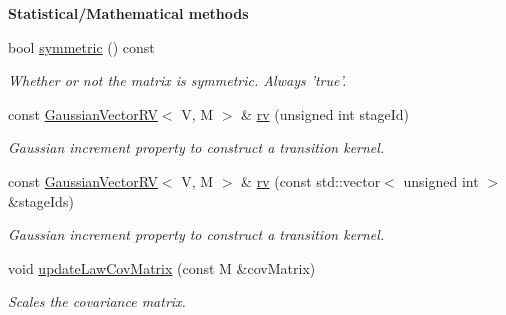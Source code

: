 \begin{Indent}{\bf Statistical/\-Mathematical methods}\par
\begin{DoxyCompactItemize}
\item 
bool \hyperlink{class_q_u_e_s_o_1_1_scaled_cov_matrix_t_k_group_a3189c3503bf9eb4229ec707594d75516}{symmetric} () const 
\begin{DoxyCompactList}\small\item\em Whether or not the matrix is symmetric. Always 'true'. \end{DoxyCompactList}\item 
const \hyperlink{class_q_u_e_s_o_1_1_gaussian_vector_r_v}{Gaussian\-Vector\-R\-V}$<$ V, M $>$ \& \hyperlink{class_q_u_e_s_o_1_1_scaled_cov_matrix_t_k_group_a892c6636742f2a613d46fcb84b80dbb5}{rv} (unsigned int stage\-Id)
\begin{DoxyCompactList}\small\item\em Gaussian increment property to construct a transition kernel. \end{DoxyCompactList}\item 
const \hyperlink{class_q_u_e_s_o_1_1_gaussian_vector_r_v}{Gaussian\-Vector\-R\-V}$<$ V, M $>$ \& \hyperlink{class_q_u_e_s_o_1_1_scaled_cov_matrix_t_k_group_a753ada276637a3c32ea77b833dda7979}{rv} (const std\-::vector$<$ unsigned int $>$ \&stage\-Ids)
\begin{DoxyCompactList}\small\item\em Gaussian increment property to construct a transition kernel. \end{DoxyCompactList}\item 
void \hyperlink{class_q_u_e_s_o_1_1_scaled_cov_matrix_t_k_group_adf9e4926c98f845c9f6c6b2ad2ddee25}{update\-Law\-Cov\-Matrix} (const M \&cov\-Matrix)
\begin{DoxyCompactList}\small\item\em Scales the covariance matrix. \end{DoxyCompactList}\end{DoxyCompactItemize}
\end{Indent}
